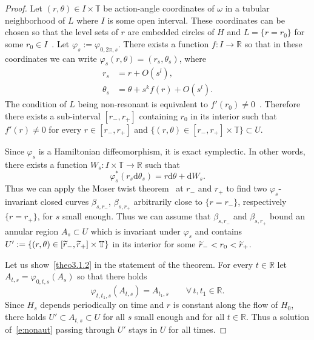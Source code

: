 \documentclass[AHL,Unicode,longabstracts,published]{cedram}
\newcommand{\R}{\mathbb{R}}
\newcommand{\T}{\mathbb{T}}
\newcommand{\diff}{\mathrm{d}}
\let\oldtilde\tilde
\renewcommand*{\tilde}[1]{\mathchoice{\widetilde{#1}}{\widetilde{#1}}{\oldtilde{#1}}{\oldtilde{#1}}}
\let\oldforall\forall
\renewcommand*{\forall}{\mathrel{\oldforall}}
\begin{document}
\begin{proof}
Let $(r,\theta)\in I\times \T$ be action-angle coordinates of $\omega$ in a tubular neighborhood of $L$ where $I$ is some open interval. These coordinates can be chosen so that the level sets of $r$ are embedded circles of $H$ and $L=\{r=r_0\}$ for some $r_0\in I$~\cite{Arnold:1978aq}. Let $\varphi_s:=\varphi_{0,2\pi,s}$. There exists a function $f:I\to\R$ so that in these coordinates we can write $\varphi_s(r,\theta)=(r_s,\theta_s)$, where
\begin{equation}\label{e:rtheta}
\begin{aligned}
r_s&=r+O\left(s^l\right),\\
\theta_s&=\theta+s^kf(r)+O\left(s^l\right).
\end{aligned}
\end{equation}
The condition of $L$ being non-resonant is equivalent to $f'(r_0)\neq0$~\cite{AB21}. Therefore there exists a sub-interval $[r_-,r_+]$ containing $r_0$ in its interior such that $f'(r)\neq 0$ for every $r\in[r_-,r_+]$ and $\{(r,\theta)\in [r_-,r_+]\times \T\}\subset U$.

Since $\varphi_s$ is a Hamiltonian diffeomorphism, it is exact symplectic. In other words, there exists a function $W_s:I\times\T\to\R$ such that
\[
\varphi_s^*\left(r_s\diff\theta_s\right)=r\diff\theta+\diff W_s.
\]
Thus we can apply the Moser twist theorem~\cite{Mos62} at $r_-$ and $r_+$ to find two $\varphi_s$-invariant closed curves $\beta_{s,r_-}$, $\beta_{s,r_+}$ arbitrarily close to $\{r=r_-\}$, respectively $\{r=r_+\}$, for $s$ small enough. Thus we can assume that $\beta_{s,r_-}$ and $\beta_{s,r_+}$ bound an annular region $A_s\subset U$ which is invariant under $\varphi_s$ and contains $U':=\{(r,\theta)\in[\tilde r_-,\tilde r_+]\times \T\}$ in its interior for some $\tilde r_-<r_0<\tilde r_+$.

Let us show~\eqref{theo3.1.2} in the statement of the theorem. For every $t\in\R$ let $A_{t,s}=\varphi_{0,t,s}(A_s)$ so that there holds
\[
\varphi_{t,t_1,s}(A_{t,s})=A_{t_1,s}\qquad \forall\,t,t_1\in\R.
\]
Since $H_s$ depends periodically on time and $r$ is constant along the flow of $H_0$, there holds $U'\subset A_{t,s}\subset U$ for all $s$ small enough and for all $t\in\R$. Thus a solution of~\eqref{e:nonaut} passing through $U'$ stays in $U$ for all times.


\end{proof}
\end{document}

